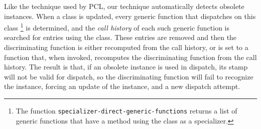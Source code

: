 Like the technique used by PCL, our technique automatically detects
obsolete instances.  When a class is updated, every generic function
that dispatches on this class%
\footnote{The function
  \texttt{specializer-direct-generic-functions} returns a list of
  generic functions that have a method using the class as a specializer.}
is determined, and the \emph{call history} of each such generic
function is searched for entries using the class.  These entries are
removed and then the discriminating function is either recomputed from
the call history, or is set to a function that, when invoked,
recomputes the discriminating function from the call history.   The
result is that, if an obsolete instance is used in dispatch, its stamp
will not be valid for dispatch, so the discriminating function will
fail to recognize the instance, forcing an update of the instance, and
a new dispatch attempt. 

